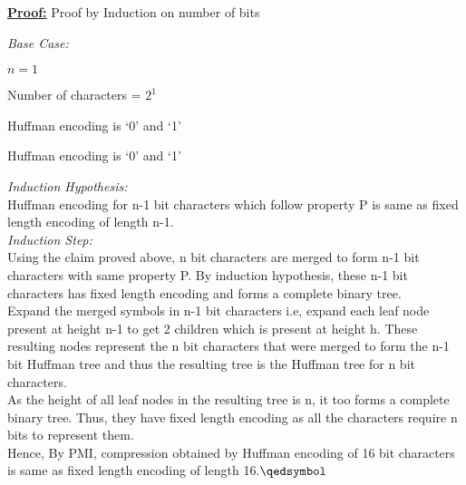 \documentclass[a4paper]{article}
\begin{document}
\begin{enumerate}[(a)]
\underline{\textbf{Proof:}} Proof by Induction on number of bits \\
    {\textit{Base Case:} \par}
    {\hspace{10mm}    $n = 1$ \par} 
    {\hspace{10mm}  Number of characters = $2^1$\par}
    {\hspace{10mm}  Huffman encoding is `0' and `1'\par}
    {\hspace{10mm}  Huffman encoding is `0' and `1'\par}
    
{\textit{Induction Hypothesis:}}\\
Huffman encoding for n-1 bit characters which follow property P is same as fixed length encoding of length n-1.\\

{\textit{Induction Step:}}\\
Using the claim proved above, n bit characters are merged to form n-1 bit characters with same property P.
By induction hypothesis, these n-1 bit characters has fixed length encoding and forms a complete binary tree.\\
Expand the merged symbols in n-1 bit characters i.e, expand each leaf node present at height n-1 to get 2 children which is present at height h. These resulting nodes represent the n bit characters that were merged to form the n-1 bit Huffman tree and thus the resulting tree is the Huffman tree for n bit characters.\\
As the height of all leaf nodes in the resulting tree is n, it too forms a complete binary tree. Thus, they have fixed length encoding as all the characters require n bits to represent them.\\

Hence, By PMI, compression obtained by Huffman encoding of 16 bit characters is same as fixed length encoding of length 16.{\hfill$\qedsymbol$}



\end{enumerate}

\newpage
\end{document}
